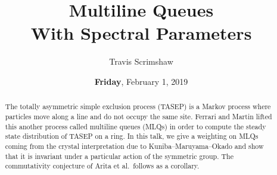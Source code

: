 \documentclass{UAmathtalk}
\author{Travis Scrimshaw}
\title{Multiline Queues\\ With Spectral Parameters}
\date{\textbf{Friday}, February 1, 2019}
\begin{document}
\maketitle

\begin{abstract}
The totally asymmetric simple exclusion process (TASEP) is a Markov process where particles move along a line and do not occupy the same site. Ferrari and Martin lifted this another process called multiline queues (MLQs) in order to compute the steady state distribution of TASEP on a ring. In this talk, we give a weighting on MLQs coming from the crystal interpretation due to Kuniba--Maruyama--Okado and show that it is invariant under a particular action of the symmetric group. The commutativity conjecture of Arita et al.\ follows as a corollary.
\end{abstract}
\end{document}
